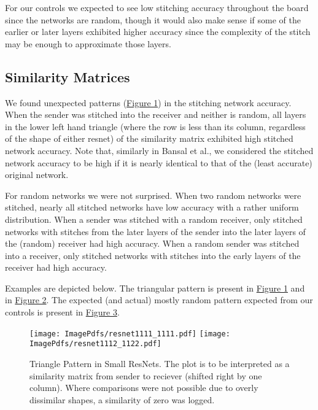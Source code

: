 \documentclass{article} %
\begin{document}
For our controls we expected to see low stitching accuracy throughout the board since the networks are random, though
it would also make sense if some of the earlier or later layers exhibited higher accuracy since the complexity of the stitch
may be enough to approximate those layers.

\subsection*{Similarity Matrices}
We found unexpected patterns (\hyperref[Figure2]{Figure 1}) in the stitching network accuracy.
When the sender was stitched into
the receiver and neither is random, all layers in the lower left hand triangle (where the row is less than its column, 
regardless of the shape of either resnet)
of the similarity matrix exhibited high stitched network accuracy. Note that, similarly in Bansal et al.,
we considered the stitched network accuracy to be high if it is nearly identical to that of the
(least accurate) original network.

For random networks we were not surprised.
When two random networks were stitched, nearly all stitched networks have low
accuracy with a rather uniform distribution. When
a sender was stitched with a random receiver, only stitched networks with stitches from the
later layers of the sender into the later layers of the (random)
receiver had high accuracy. When a random sender was stitched
into a receiver, only stitched networks with stitches into the early layers of the
receiver had high accuracy.

Examples are depicted below. The triangular pattern is present in \hyperref[Figure2]{Figure 1} and in \hyperref[Figure3]{Figure 2}.
The expected (and actual) mostly random pattern expected from our controls is present in \hyperref[Figure4]{Figure 3}.

\label{Figure2}
\begin{center}
   \begin{figure}[H]
      \centering
      \texttt{[image: ImagePdfs/resnet1111\_1111.pdf]}
      \texttt{[image: ImagePdfs/resnet1112\_1122.pdf]}
      \caption{Triangle Pattern in Small ResNets.
      The plot is to be interpreted as a similarity matrix from sender to reciever (shifted right by one column).
      Where comparisons were not possible due to overly dissimilar shapes, a similarity of zero was logged.}
   \end{figure}
\end{center}
\end{document}

